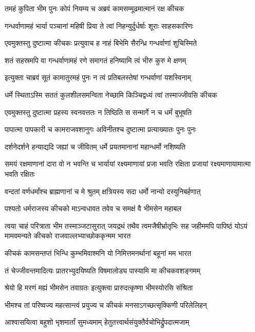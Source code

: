 \twolineshloka
{तमहं कुपिता भीम पुनः कोपं नियम्य च}
{अब्रवं कामसम्मूढमात्मानं रक्ष कीचक}


\twolineshloka
{गन्धर्वाणामहं भार्या पञ्चानां महिषी प्रिया}
{ते त्वां निहन्युर्दुर्धर्षाः शूराः साहसकारिणः}


\twolineshloka
{एवमुक्तस्तु दुष्टात्मा कीचकः प्रत्युवाच ह}
{नाहं बिभेमि सैरन्ध्रि गन्धर्वाणां शुचिस्मिते}


\twolineshloka
{शतं सहस्रमपि वा गन्धर्वाणामहं रणे}
{समागतं हनिष्यामि त्वं भीरु कुरु मे क्षणम्}


\twolineshloka
{इत्युक्ता चाब्रवं सूतं कामातुरमहं पुनः}
{न त्वं प्रतिबलस्तेषां गन्धर्वाणां यशस्विनाम्}


\twolineshloka
{धर्मे स्थिताऽस्मि सततं कुलशीलसमन्विता}
{नेच्छामि किञ्चिद्वध्यं त्वां तस्माज्जीवसि कीचक}


\twolineshloka
{एवमुक्तस्तु दुष्टात्मा प्रहस्य स्वनवत्ततः}
{न तिष्ठिति स सन्मार्गे न च धर्मं बुभूषति}


\twolineshloka
{पापात्मा पापकारी च कामराजवशानुगः}
{अविनीतश्च दुष्टात्मा प्रत्याख्यातः पुनः पुनः}


\twolineshloka
{दर्शनेदर्शने हन्याद्यदि जह्यां च जीवितम्}
{धर्मे प्रयतमानानां महान्धर्मो नशिष्यति}


\threelineshloka
{समयं रक्षमाणानां दारा वो न भवन्ति च}
{भार्यायां रक्ष्यमाणायां प्रजा भवति रक्षिता}
{प्रजायां रक्ष्यमाणायामात्मा भवति रक्षितः}


\twolineshloka
{वन्दतां वर्णधर्मांश्च ब्राह्मणानां च मे श्रुतम्}
{क्षत्रियस्य सदा धर्मो नान्यो दस्युनिबर्हणात्}


\twolineshloka
{पश्यतो धर्मराजस्य कीचको माऽन्वधावत}
{तवेव च समक्षं वै भीमसेन महाबल}


\onelineshloka
{त्वया चाहं परित्राता भीम तस्माञ्जटासुरात्}
\threelineshloka
{जयद्रथं तथैव त्वमजैषीर्भ्रातृभिः सह}
{जहीममपि पापिष्ठं योऽयं मामवमन्यते}
{कीचको राजवाल्लभ्याच्छोककृन्मम भारत}


\twolineshloka
{कीचकं कामसन्तप्तं भिन्धि कुम्भमिवाश्मनि}
{यो निमित्तमनर्थानां बहूनां मम भारत}


\twolineshloka
{तं चेज्जीवन्तमादित्यः प्रातरभ्युदयिष्यति}
{विषमालोड्य पास्यामि मा कीचकवशङ्गमम्}


\twolineshloka
{श्रेयो हि मरणं मह्यं भीमसेन तवाग्रतः}
{इत्युक्त्वा प्रारुदत्कृष्णा भीमस्योरसि संश्रिता}


\twolineshloka
{भीमश्च तां परिष्वज्य महत्सान्त्वं प्रयुज्य च}
{कीचकं मनसाऽगच्छत्सृक्किणी परिलेलिहन्}


\twolineshloka
{आश्वासयित्वा बहुशो भृशमार्तां सुमध्यमाम्}
{हेतुतत्त्वार्थसंयुक्तैर्वचोभिर्द्रुपदात्मजाम्}


